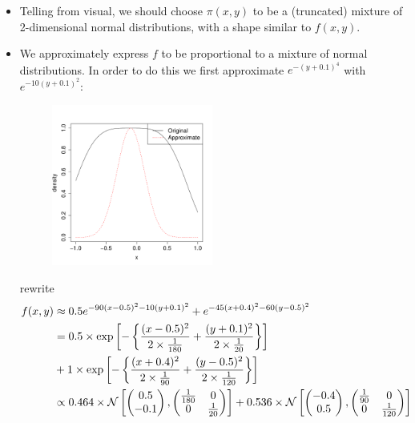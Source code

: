 \documentclass[12pt]{article}
\begin{document}
\begin{itemize}
	\item Telling from visual, we should choose $\pi(x, y)$ to be a (truncated) mixture of 2-dimensional normal distributions, with a shape similar to $f(x, y)$.
	\item We approximately express $f$ to be proportional to a mixture of normal distributions. In order to do this we first approximate $e^{-(y+0.1)^4}$ with $e^{-10(y+0.1)^2}$:
	\begin{figure}[H]
		\centering
		\includegraphics[width=0.5\textwidth]{illustration.pdf}
	\end{figure}
	rewrite
	\begin{align}
		f(x, y) &\approx 0.5 e^ {-90 (x-0.5)^2 - 10 (y+0.1)^2}  +  e^{-45 (x+0.4)^2-60 (y-0.5)^2}\nonumber\\
		 &= 0.5 \times \exp \left[ - \left\{ \frac{(x-0.5)^2}{2\times \frac{1}{180}} + \frac{(y+0.1)^2}{2\times \frac{1}{20}} \right\} \right]\nonumber\\
		 &+ 1\times \exp\left[ -\left\{ \frac{(x+0.4)^2}{2\times\frac{1}{90}} + \frac{(y-0.5)^2}{2\times\frac{1}{120}} \right\} \right]\nonumber\\
		 &\propto 0.464 \times {\cal N}\left[ \begin{pmatrix} 0.5\\ -0.1
		 \end{pmatrix}, \begin{pmatrix} \frac{1}{180} & 0\\ 0 & \frac{1}{20} \end{pmatrix} \right]
		 + 0.536 \times {\cal N}\left[ \begin{pmatrix} -0.4\\ 0.5
		 \end{pmatrix}, \begin{pmatrix} \frac{1}{90} & 0\\ 0 & \frac{1}{120} \end{pmatrix} \right]    \label{GaussianMixture}

\end{align}
\end{itemize}
\end{document}
